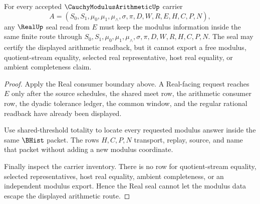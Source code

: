 \begin{theorem}
\label{thm:cauchymodulusarithmetic-real-seal-modulus-nonescape}
For every accepted $\CauchyModulusArithmeticUp$ carrier
$$
A=(S_0,S_1,\mu_0,\mu_1,\mu_{\wedge},\sigma,\pi,D,W,R,E,H,C,P,N),
$$
any $\RealUp$ seal read from $E$ must keep the modulus information inside the
same finite route through $S_0,S_1,\mu_0,\mu_1,\mu_{\wedge},\sigma,\pi,D,W,R,H,C,P,N$.
The seal may certify the displayed arithmetic readback, but it cannot export a
free modulus, quotient-stream equality, selected real representative, host real
equality, or ambient completeness claim.
\end{theorem}
\begin{proof}
Apply the Real consumer boundary above. A Real-facing request reaches $E$ only
after the source schedules, the shared meet row, the arithmetic consumer row,
the dyadic tolerance ledger, the common window, and the regular rational
readback have already been displayed.

Use shared-threshold totality to locate every requested modulus answer inside
the same $\BHist$ packet. The rows $H,C,P,N$ transport, replay, source, and name
that packet without adding a new modulus coordinate.

Finally inspect the carrier inventory. There is no row for quotient-stream
equality, selected representatives, host real equality, ambient completeness, or
an independent modulus export. Hence the Real seal cannot let the modulus data
escape the displayed arithmetic route.
\end{proof}

